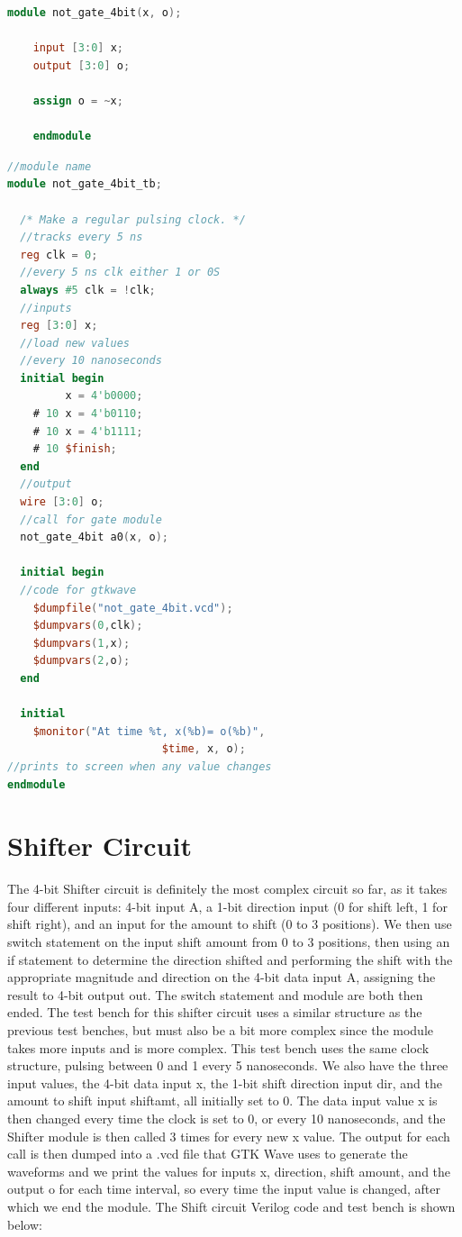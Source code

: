 \documentclass[runningheads, 12pt]{report}
\begin{document}
\begin{lstlisting}[language=Verilog, caption={Not Circuit Verilog}]
	module not_gate_4bit(x, o);

	input [3:0] x;
	output [3:0] o;

	assign o = ~x;

	endmodule
\end{lstlisting}

\begin{lstlisting}[language=Verilog, caption={Not Circuit Test Bench}]
//module name
module not_gate_4bit_tb;		

  /* Make a regular pulsing clock. */	
  //tracks every 5 ns
  reg clk = 0;
  //every 5 ns clk either 1 or 0S
  always #5 clk = !clk;	
  //inputs
  reg [3:0] x;	
  //load new values
  //every 10 nanoseconds
  initial begin	
    	 x = 4'b0000;	
    # 10 x = 4'b0110;
    # 10 x = 4'b1111;
    # 10 $finish;	
  end
  //output
  wire [3:0] o;	
  //call for gate module
  not_gate_4bit a0(x, o);	
  
  initial begin	
  //code for gtkwave
    $dumpfile("not_gate_4bit.vcd");
    $dumpvars(0,clk);
    $dumpvars(1,x);
    $dumpvars(2,o);
  end
  
  initial
    $monitor("At time %t, x(%b)= o(%b)",
    					$time, x, o);  
//prints to screen when any value changes
endmodule 
\end{lstlisting}
	
	\section{Shifter Circuit}
	
	The 4-bit Shifter circuit is definitely the most complex circuit so far, as it takes four different inputs: 4-bit input A, a 1-bit direction input (0 for shift left, 1 for shift right), and an input for the amount to shift (0 to 3 positions). We then use switch statement on the input shift amount from 0 to 3 positions, then using an if statement to determine the direction shifted and performing the shift with the appropriate magnitude and direction on the 4-bit data input A, assigning the result to 4-bit output out. The switch statement and module are both then ended. The test bench for this shifter circuit uses a similar structure as the previous test benches, but must also be a bit more complex since the module takes more inputs and is more complex. This test bench uses the same clock structure, pulsing between 0 and 1 every 5 nanoseconds. We also have the three input values, the 4-bit data input x, the 1-bit shift direction input dir, and the amount to shift input shift\textunderscore amt, all initially set to 0. The data input value x is then changed every time the clock is set to 0, or every 10 nanoseconds, and the Shifter module is then called 3 times for every new x value. The output for each call is then dumped into a .vcd file that GTK Wave uses to generate the waveforms and we print the values for inputs x, direction, shift amount, and the output o for each time interval, so every time the input value is changed, after which we end the module. The Shift circuit Verilog code and test bench is shown below: 
\end{document}
